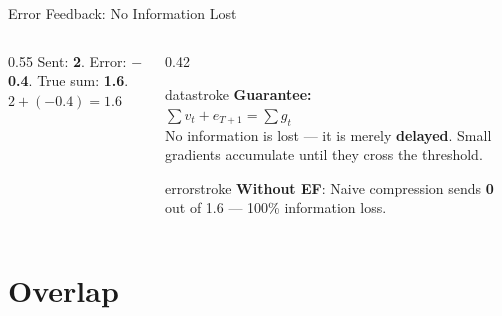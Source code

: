 \documentclass[aspectratio=169, 12pt]{beamer}
\begin{document}
\begin{frame}{Error Feedback: No Information Lost}
\begin{columns}[T]
\begin{column}{0.55\textwidth}
    \vspace{0.1cm}
    {\footnotesize Sent: \textbf{2}. Error: \textbf{$-$0.4}. True sum: \textbf{1.6}.\\
    $2 + (-0.4) = 1.6$ \checkmark}
  \end{column}
  \begin{column}{0.42\textwidth}
    \begin{mlsyscard}{datastroke}
    \textbf{Guarantee:}\\[0.1cm]
    {\footnotesize
    $\sum v_t + e_{T+1} = \sum g_t$\\[0.1cm]
    No information is lost --- it is merely \textbf{delayed}. Small gradients accumulate until they cross the threshold.
    }
    \end{mlsyscard}

    \vspace{0.15cm}
    \begin{mlsyscard}{errorstroke}
    {\footnotesize \textbf{Without EF}: Naive compression sends \textbf{0} out of 1.6 --- 100\% information loss.}
    \end{mlsyscard}
  \end{column}
\end{columns}

\end{frame}

\section{Overlap}
\end{document}

